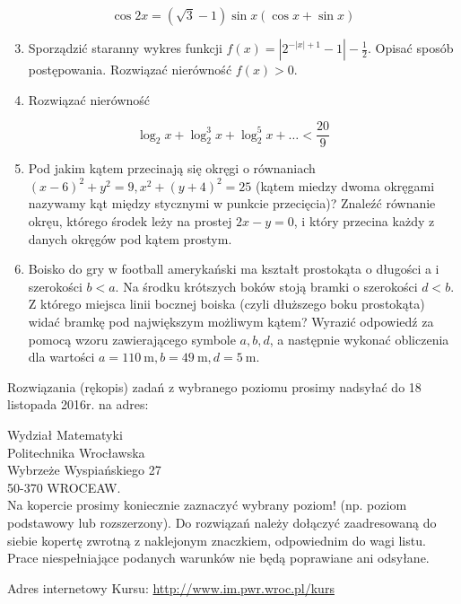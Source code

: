 \documentclass[10pt]{article}
\begin{document}
$$
\cos 2 x=(\sqrt{3}-1) \sin x(\cos x+\sin x)
$$

\begin{enumerate}
  \setcounter{enumi}{2}
  \item Sporządzić staranny wykres funkcji $f(x)=\left|2^{-|x|+1}-1\right|-\frac{1}{2}$. Opisać sposób postępowania. Rozwiązać nierówność $f(x)>0$.
  \item Rozwiązać nierówność
\end{enumerate}

$$
\log _{2} x+\log _{2}^{3} x+\log _{2}^{5} x+\ldots<\frac{20}{9}
$$

\begin{enumerate}
  \setcounter{enumi}{4}
  \item Pod jakim kątem przecinają się okręgi o równaniach $(x-6)^{2}+y^{2}=9, x^{2}+(y+4)^{2}=25$ (kątem miedzy dwoma okręgami nazywamy kąt między stycznymi w punkcie przecięcia)? Znaleźć równanie okręu, którego środek leży na prostej $2 x-y=0$, i który przecina każdy z danych okręgów pod kątem prostym.
  \item Boisko do gry w football amerykański ma kształt prostokąta o długości a i szerokości $b<a$. Na środku krótszych boków stoją bramki o szerokości $d<b$. Z którego miejsca linii bocznej boiska (czyli dłuższego boku prostokąta) widać bramkę pod największym możliwym kątem? Wyrazić odpowiedź za pomocą wzoru zawierającego symbole $a, b, d$, a następnie wykonać obliczenia dla wartości $a=110 \mathrm{~m}, b=49 \mathrm{~m}, d=5 \mathrm{~m}$.
\end{enumerate}

Rozwiązania (rękopis) zadań z wybranego poziomu prosimy nadsyłać do 18 listopada 2016r. na adres:

Wydział Matematyki\\
Politechnika Wrocławska\\
Wybrzeże Wyspiańskiego 27\\
50-370 WROCEAW.\\
Na kopercie prosimy koniecznie zaznaczyć wybrany poziom! (np. poziom podstawowy lub rozszerzony). Do rozwiązań należy dołączyć zaadresowaną do siebie kopertę zwrotną z naklejonym znaczkiem, odpowiednim do wagi listu. Prace niespełniające podanych warunków nie będą poprawiane ani odsyłane.

Adres internetowy Kursu: \href{http://www.im.pwr.wroc.pl/kurs}{http://www.im.pwr.wroc.pl/kurs}
\end{document}
